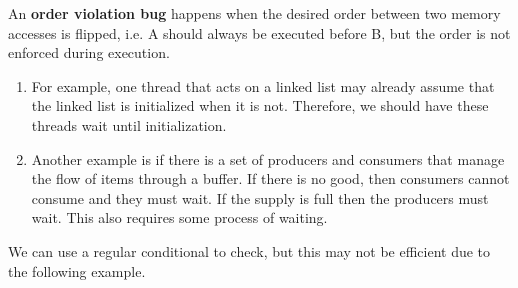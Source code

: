 \documentclass{article}
\begin{document}
    \begin{definition}
      An \textbf{order violation bug} happens when the desired order between two memory accesses is flipped, i.e. A should always be executed before B, but the order is not enforced during execution. 
      \begin{enumerate}
        \item For example, one thread that acts on a linked list may already assume that the linked list is initialized when it is not. Therefore, we should have these threads wait until initialization. 
        \item Another example is if there is a set of producers and consumers that manage the flow of items through a buffer. If there is no good, then consumers cannot consume and they must wait. If the supply is full then the producers must wait. This also requires some process of waiting. 
      \end{enumerate}
    \end{definition}

    We can use a regular conditional to check, but this may not be efficient due to the following example. 
\end{document}
